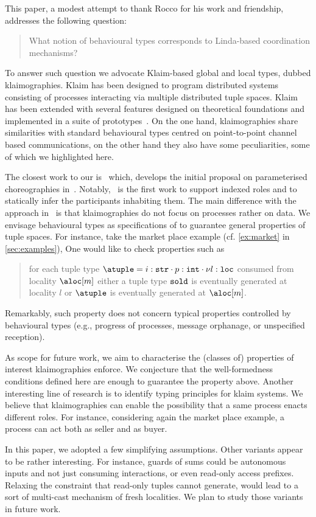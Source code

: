 

This paper, a modest attempt to thank Rocco for his work and
friendship, addresses the following question:
%
\begin{quote}
  What notion of behavioural types corresponds to Linda-based
  coordination mechanisms?
\end{quote}
%
To answer such question we advocate Klaim-based global and local
types, dubbed klaimographies.
%
Klaim has been designed to program distributed systems consisting of
processes interacting via multiple distributed tuple spaces.
%
Klaim has been extended with several features designed on theoretical
foundations and implemented in a suite of
prototypes~\cite{klaim}.
%
On the one hand, klaimographies share similarities with standard
behavioural types centred on point-to-point channel based
communications, on the other hand they also have some peculiarities,
some of which we highlighted here.



The closest work to our is~\cite{chjny19} which, develops the initial
proposal on parameterised choreographies in~\cite{ydbh10,dybh12}.
%
Notably,~\cite{chjny19} is the first work to support indexed roles and
to statically infer the participants inhabiting them.
%
The main difference with the approach in~\cite{chjny19} is that
klaimographies do not focus on processes rather on data.
%
We envisage behavioural types as specifications of to guarantee
general properties of tuple spaces.
%
For instance, take the market place example (cf. \cref{ex:market} in
\cref{sec:examples}),
%
One would like to check properties such as
\begin{quote}
  for each tuple type
  $\atuple = {{i : \asort[str]} \cdot {p : \asort[int]} \cdot {\nu l :
      \asort[loc]}}$ consumed from locality $\aloc[m]$ either a tuple type
  $\asort[sold]$ is eventually generated at locality $l$ or $\atuple$
  is eventually generated at $\aloc[m]$.
\end{quote}
%
Remarkably, such property does not concern typical properties
controlled by behavioural types (e.g., progress of processes, message
orphanage, or unspecified reception).

As scope for future work, we aim to characterise the (classes of)
properties of interest klaimographies enforce.
%
We conjecture that the well-formedness conditions defined here
are enough to guarantee the property above.
%
Another interesting line of research is to identify typing principles
for klaim systems.
%
We believe that klaimographies can enable the possibility that a same
process enacts different roles.
%
For instance, considering again the market place example, a process
can act both as seller and as buyer.

In this paper, we adopted a few simplifying assumptions.
%
Other variants appear to be rather interesting.
%
For instance, guards of sums could be autonomous inputs and not just
consuming interactions, or even read-only access prefixes.
%
Relaxing the constraint that read-only tuples cannot generate, would
lead to a sort of multi-cast mechanism of fresh localities.
%
We plan to study those variants in future work.


